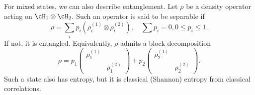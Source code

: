 For mixed states, we can also describe entanglement. Let $\rho$ be a density operator acting on $\cH_1 \otimes \cH_2$. Such an operator is said to be separable if
\begin{equation}
    \rho = \sum_i p_i (\rho_i^{(1)} \otimes \rho_i^{(2)}), \quad \sum p_i = 0, 0\leq p_i \leq 1.
\end{equation}
If not, it is entangled. Equivalently, $\rho$ admits a block decomposition
\begin{equation}
    \rho = p_1 \begin{pmatrix}
    \boxed{\rho_1^{(1)}} &\\
    & \boxed{\rho_1^{(2)}}
    \end{pmatrix} + p_2 \begin{pmatrix}
    \boxed{\rho_2^{(1)}} &\\
    & \boxed{\rho_2^{(2)}}
    \end{pmatrix}.
\end{equation}
Such a state also has entropy, but it is classical (Shannon) entropy from classical correlations.

